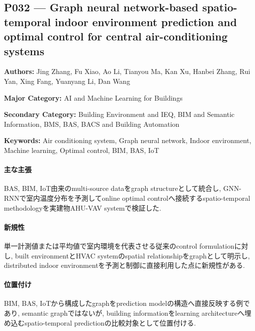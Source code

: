 \subsection{P032 --- Graph neural network-based spatio-temporal indoor environment prediction and optimal control for central air-conditioning systems}
\label{paper:P032}
\textbf{Authors:} Jing Zhang, Fu Xiao, Ao Li, Tianyou Ma, Kan Xu, Hanbei Zhang, Rui Yan, Xing Fang, Yuanyang Li, Dan Wang\par
\textbf{Major Category:} AI and Machine Learning for Buildings\par
\textbf{Secondary Category:} Building Environment and IEQ, BIM and Semantic Information, BMS, BAS, BACS and Building Automation\par
\textbf{Keywords:} Air conditioning system, Graph neural network, Indoor environment, Machine learning, Optimal control, BIM, BAS, IoT\par
\paragraph{主な主張}
BAS, BIM, IoT由来のmulti-source dataをgraph structureとして統合し, GNN-RNNで室内温度分布を予測してonline optimal controlへ接続するspatio-temporal methodologyを実建物AHU-VAV systemで検証した. \cite{Zhang:2023GNNIndoorControl}
\paragraph{新規性}
単一計測値または平均値で室内環境を代表させる従来のcontrol formulationに対し, built environmentとHVAC systemのspatial relationshipをgraphとして明示し, distributed indoor environmentを予測と制御に直接利用した点に新規性がある.
\paragraph{位置付け}
BIM, BAS, IoTから構成したgraphをprediction modelの構造へ直接反映する例であり, semantic graphではないが, building informationをlearning architectureへ埋め込むspatio-temporal predictionの比較対象として位置付ける.
